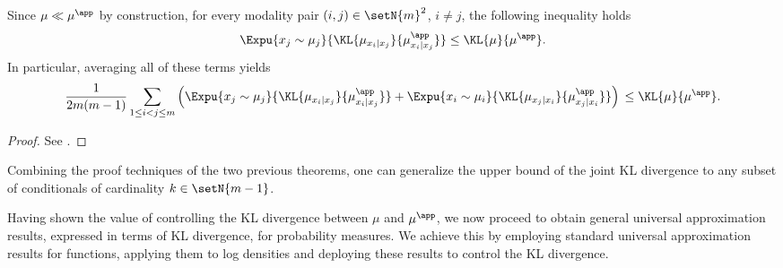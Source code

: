 \documentclass{article}
\begin{document}
\begin{theorem}
 \label{thm:JointVsPairwiseConditionals}
 Since $\mu \ll \mu^\app$ by construction, for every modality pair
 $(i,j) \in \setN{m}^2$, $i \neq j$, the following inequality holds
 \begin{align*}
  \Expu{x_j\sim \mu_j}{\KL{\mu_{x_i\vert x_j}}{\mu^\app_{x_i\vert x_j}}}
  \leq \KL{\mu}{\mu^\app}.
 \end{align*}
 In particular, averaging all of these terms yields
 \begin{equation*}
  \frac{1}{2m(m-1)} \sum_{1 \leq i < j \leq m}
  \left(
  \Expu{x_j\sim \mu_j}{\KL{\mu_{x_i\vert x_j}}{\mu^\app_{x_i\vert x_j}}}
  + \Expu{x_i\sim \mu_i}{\KL{\mu_{x_j\vert x_i}}{\mu^\app_{x_j\vert x_i}}}
  \right)                                         \\
  \leq \KL{\mu}{\mu^\app}.
 \end{equation*}
\end{theorem}
\begin{proof}
 See .
\end{proof}

\begin{remark}
 Combining the proof techniques of the two previous theorems,
 one can generalize the upper bound of the joint KL divergence
 to any subset of conditionals of cardinality $k \in \setN{m-1}$.
\end{remark}
Having shown the value of controlling the KL divergence
between $\mu$ and $\mu^\app$, we now proceed to obtain general
universal approximation results, expressed in terms of KL divergence,
for probability measures. We achieve this by employing standard
universal approximation results for functions,
applying them to log densities and deploying these results
to control the KL divergence.
\end{document}
